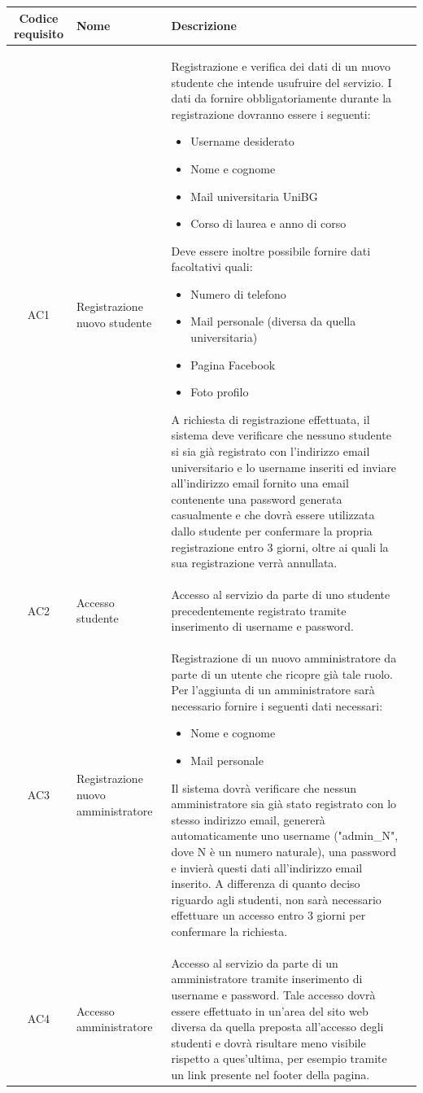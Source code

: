 \documentclass[10pt,a4paper]{report}
\begin{document}
	\begin{tabular}{cp{3cm}p{9cm}p{1cm}}
		Codice requisito&Nome&Descrizione\\ \hline
		AC1&Registrazione nuovo studente&Registrazione e verifica dei dati di un nuovo studente che intende usufruire del servizio. I dati da fornire obbligatoriamente durante la registrazione dovranno essere i seguenti:
		\begin{itemize}
			\item Username desiderato
			\item Nome e cognome
			\item Mail universitaria UniBG
			\item Corso di laurea e anno di corso
		\end{itemize}
		Deve essere inoltre possibile fornire dati facoltativi quali:
		\begin{itemize}
			\item Numero di telefono
			\item Mail personale (diversa da quella universitaria)
			\item Pagina Facebook
			\item Foto profilo
		\end{itemize}
		A richiesta di registrazione effettuata, il sistema deve verificare che nessuno studente si sia già registrato con l'indirizzo email universitario e lo username inseriti ed inviare all'indirizzo email fornito una email contenente una password generata casualmente e che dovrà essere utilizzata dallo studente per confermare la propria registrazione entro 3 giorni, oltre ai quali la sua registrazione verrà annullata.\\ \hline
		AC2&Accesso studente&Accesso al servizio da parte di uno studente precedentemente registrato tramite inserimento di username e password.\\ \hline
		AC3&Registrazione nuovo amministratore&Registrazione di un nuovo amministratore da parte di un utente che ricopre già tale ruolo. Per l'aggiunta di un amministratore sarà necessario fornire i seguenti dati necessari:
		\begin{itemize}
			\item Nome e cognome
			\item Mail personale
		\end{itemize}
		Il sistema dovrà verificare che nessun amministratore sia già stato registrato con lo stesso indirizzo email, genererà automaticamente uno username ("admin\_N", dove N è un numero naturale), una password e invierà questi dati all'indirizzo email inserito. A differenza di quanto deciso riguardo agli studenti, non sarà necessario effettuare un accesso entro 3 giorni per confermare la richiesta.\\ \hline
		AC4&Accesso amministratore&Accesso al servizio da parte di un amministratore tramite inserimento di username e password. Tale accesso dovrà essere effettuato in un'area del sito web diversa da quella preposta all'accesso degli studenti e dovrà risultare meno visibile rispetto a ques'ultima, per esempio tramite un link presente nel footer della pagina.\\ \hline
	\end{tabular}
\end{document}
